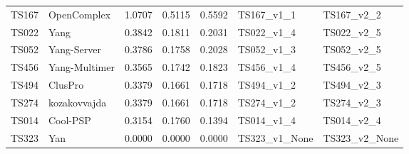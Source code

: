 \begin{table}[ht]
{\begin{tabular}{llrrrll}
TS167 & OpenComplex & 1.0707 & 0.5115 & 0.5592 & TS167\_v1\_1 & TS167\_v2\_2 \\ 
TS022 & Yang & 0.3842 & 0.1811 & 0.2031 & TS022\_v1\_4 & TS022\_v2\_5 \\ 
TS052 & Yang-Server & 0.3786 & 0.1758 & 0.2028 & TS052\_v1\_3 & TS052\_v2\_5 \\ 
TS456 & Yang-Multimer & 0.3565 & 0.1742 & 0.1823 & TS456\_v1\_4 & TS456\_v2\_5 \\ 
TS494 & ClusPro & 0.3379 & 0.1661 & 0.1718 & TS494\_v1\_2 & TS494\_v2\_3 \\ 
TS274 & kozakovvajda & 0.3379 & 0.1661 & 0.1718 & TS274\_v1\_2 & TS274\_v2\_3 \\ 
TS014 & Cool-PSP & 0.3154 & 0.1760 & 0.1394 & TS014\_v1\_4 & TS014\_v2\_4 \\ 
TS323 & Yan & 0.0000 & 0.0000 & 0.0000 & TS323\_v1\_None & TS323\_v2\_None \\ 
\bottomrule
\end{tabular}%
}
\end{table}
